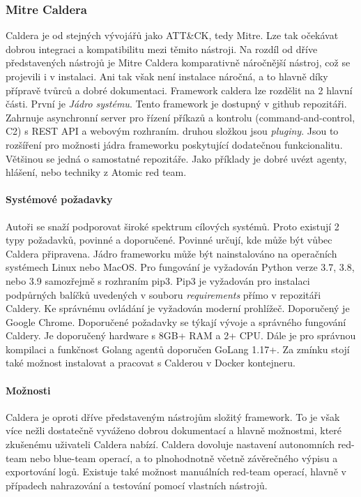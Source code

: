 \subsubsection{Mitre Caldera}
Caldera je od stejných vývojářů jako ATT\&CK, tedy Mitre.
Lze tak očekávat dobrou integraci a kompatibilitu mezi těmito nástroji.
Na rozdíl od dříve představených nástrojů je Mitre Caldera komparativně náročnější nástroj, což se projevili i v instalaci.
Ani tak však není instalace náročná, a to hlavně díky přípravě tvůrců a dobré dokumentaci\cite{mitre_caldera_docs}.
Framework caldera lze rozdělit na 2 hlavní části.
První je \textit{Jádro systému}.
Tento framework je dostupný v github repozitáři.
Zahrnuje asynchronní server pro řízení příkazů a kontrolu (command-and-control, C2) s REST API a webovým rozhraním.
druhou složkou jsou \textit{pluginy}.
Jsou to rozšíření pro možnosti jádra frameworku poskytující dodatečnou funkcionalitu.
Většinou se jedná o samostatné repozitáře.
Jako příklady je dobré uvézt agenty, hlášení, nebo  techniky z Atomic red team.\cite{mitre_caldera}

\paragraph{Systémové požadavky}
Autoři se snaží podporovat široké spektrum cílových systémů.
Proto existují 2 typy požadavků, povinné a doporučené.
Povinné určují, kde může být vůbec Caldera připravena.
Jádro frameworku může být nainstalováno na operačních systémech Linux nebo MacOS.
Pro fungování je vyžadován Python verze 3.7, 3.8, nebo 3.9 samozřejmě s rozhraním pip3.
Pip3 je vyžadován pro instalaci podpůrných balíčků uvedených v souboru \textit{requirements} přímo v repozitáři Caldery.
Ke správnému ovládání je vyžadován moderní prohlížeč.
Doporučený je Google Chrome.
Doporučené požadavky se týkají vývoje a správného fungování Caldery.
Je doporučený hardware s 8GB+ RAM a 2+ CPU\@.
Dále je pro správnou kompilaci a funkčnost Golang agentů doporučen GoLang 1.17+.
Za zmínku stojí také možnost instalovat a pracovat s Calderou v Docker kontejneru.\cite{mitre_caldera_docs}

\paragraph{Možnosti}
Caldera je oproti dříve představeným nástrojům složitý framework.
To je však více nežli dostatečně vyváženo dobrou dokumentací a hlavně možnostmi, které zkušenému uživateli Caldera nabízí.
Caldera dovoluje nastavení autonomních red-team nebo blue-team operací, a to plnohodnotně včetně závěrečného výpisu a exportování logů.
Existuje také možnost manuálních red-team operací, hlavně v případech nahrazování a testování pomocí vlastních nástrojů.\cite{mitre_caldera_docs}




